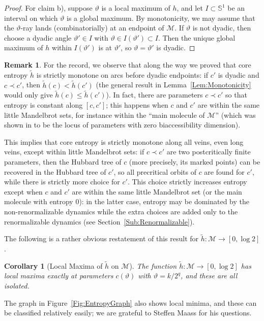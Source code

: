 \documentclass[12pt]{amsart}
\newcommand{\M}{\mathscr M}
\newcommand{\Circle}{\mathbb S^1}
\newcommand{\0}{\texttt{0}}
\newcommand{\1}{\texttt{1}}
\newtheorem{corollary}[theorem]{Corollary}
\theoremstyle{definition}
\newtheorem*{remark}{Remark}
\numberwithin{equation}{section}
\renewcommand{\theta}{\vartheta}
\newcommand{\lineclear}{\rule{0pt}{2pt}\newline}
\begin{document}
\begin{proof}
For claim b), suppose $\theta$ is a local maximum of $h$, and let $I\subset\Circle$ be an interval on which $\theta$ is a global maximum. By monotonicity, we may assume that the $\theta$-ray lands (combinatorially) at an endpoint of $\M$. If $\theta$ is not dyadic, then choose a dyadic angle $\theta'\in I$ with $\theta\in I(\theta')\subset I$. 
Then the unique global maximum of $h$ within $I(\theta')$ is at $\theta'$, so $\theta=\theta'$ is dyadic.
\end{proof}

\begin{remark}
For the record, we observe that along the way we proved that core entropy $\tilde h$ is strictly monotone on arcs before dyadic endpoints: if $c'$ is dyadic and $c\prec c'$, then $\tilde h(c)<\tilde h(c')$ (the general result in Lemma~\ref{Lem:Monotonicity} would only give $\tilde h(c)\le \tilde h(c')$). In fact, there are parameters $c\prec c'$ so that entropy is constant along $[c,c']$; this happens when $c$ and $c'$ are within the same little Mandelbrot sets, for instance within the ``main molecule of $\M$'' (which  was shown in \cite{BruinSchleicher} to be the locus of parameters with zero biaccessibility dimension). 

This implies that core entropy is strictly monotone along all veins, even long veins, except within little Mandelbrot sets: 
if $c\prec c'$ are two postcritically finite parameters, then the Hubbard tree of $c$ (more precisely, its marked points)
can be recovered in the Hubbard tree of $c'$, so all precritical orbits of $c$ are found for $c'$, while there is strictly more choice for $c'$. This choice strictly increases entropy except when $c$ and $c'$ are within the same little Mandelbrot set (or the main molecule with entropy $0$): in the latter case, entropy may be dominated by the non-renormalizable dynamics while the extra choices are added only to the renormalizable dynamics (see Section~\ref{Sub:Renormalizable}). 
\end{remark}

The following is a rather obvious restatement of this result for $\tilde h\colon\M\to[0,\log 2]$.

\begin{corollary}[Local Maxima of $\tilde h$ on $\M$]
\lineclear
The function $\tilde h\colon\M\to[0,\log 2]$ has local maxima exactly at parameters $c(\theta)$ with $\theta=k/2^q$, and these are all isolated.
\end{corollary}

The graph in Figure~\ref{Fig:EntropyGraph} also shows local minima, and these can be classified relatively easily; we are grateful to Steffen Maass for his questions.
\end{document}
